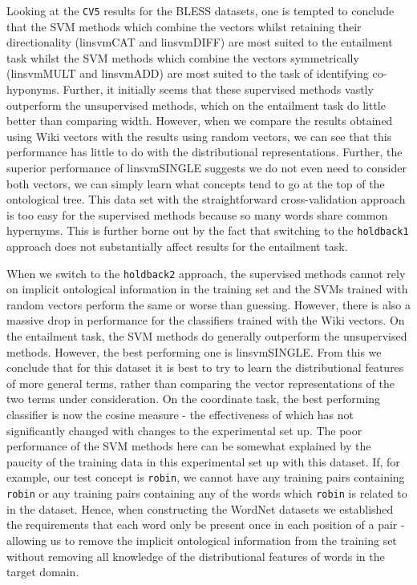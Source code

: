 \documentclass[11pt]{article}
\begin{document}
Looking at the \texttt{CV5} results for the BLESS datasets, one is tempted to conclude that the SVM methods which combine the vectors whilst retaining their directionality (linsvmCAT and linsvmDIFF) are most suited to the entailment task whilst the SVM methods which combine the vectors symmetrically (linsvmMULT and linsvmADD) are most suited to the task of identifying co-hyponyms.  Further, it initially seems that these supervised methods vastly outperform the unsupervised methods, which on the entailment task do little better than comparing width.  However, when we compare the results obtained using Wiki vectors with the results using random vectors, we can see that this performance has little to do with the distributional representations.  Further, the superior performance of linsvmSINGLE suggests we do not even need to consider both vectors, we can simply learn what concepts tend to go at the top of the ontological tree.  This data set with the straightforward cross-validation approach is too easy for the supervised methods because so many words share common hypernyms.  This is further borne out by the fact that switching to the \texttt{holdback1} approach does not substantially affect results for the entailment task.

When we switch to the \texttt{holdback2} approach, the supervised methods cannot rely on implicit ontological information in the training set and the SVMs trained with random vectors perform the same or worse than guessing.  However, there is also a massive drop in performance for the classifiers trained with the Wiki vectors.   On the entailment task, the SVM methods do generally outperform the unsupervised methods.  However, the best performing one is linsvmSINGLE.  From this we conclude that for this dataset it is best to try to learn the distributional features of more general terms, rather than comparing the vector representations of the two terms under consideration.   On the coordinate task, the best performing classifier is now the cosine measure - the effectiveness of which has not significantly changed with changes to the experimental set up.   The poor performance of the SVM methods here can be somewhat explained by the paucity of the training data in this experimental set up with this dataset.  If, for example, our test concept is \texttt{robin}, we cannot have any training pairs containing \texttt{robin} or any training pairs containing any of the words which \texttt{robin} is related to in the dataset.  Hence, when constructing the WordNet datasets we established the requirements that each word only be present once in each position of a pair - allowing us to remove the implicit ontological information from the training set without removing all knowledge of the distributional features of words in the target domain.
\end{document}

